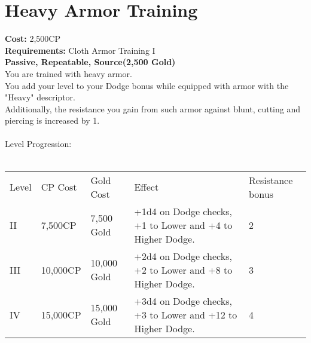 \section{Heavy Armor Training}\label{perk:heavyArmorTraining}
\textbf{Cost:} 2,500CP\\
\textbf{Requirements:} Cloth Armor Training I\\
\textbf{Passive, Repeatable, Source(2,500 Gold)}\\
You are trained with heavy armor.\\
You add your level to your Dodge bonus while equipped with armor with the "Heavy" descriptor.\\
Additionally, the resistance you gain from such armor against blunt, cutting and piercing is increased by 1.\\
\\

Level Progression:\\
\\
\begin{tabular}{l | l | l | l | l}
    Level & CP Cost & Gold Cost & Effect & Resistance bonus \\
    II
    & 7,500CP
    & 7,500 Gold
    & +1d4 on Dodge checks, +1 to Lower and +4 to Higher Dodge.
    & 2
    \\
    III
    & 10,000CP
    & 10,000 Gold
    & +2d4 on Dodge checks, +2 to Lower and +8 to Higher Dodge.
    & 3
    \\
    IV
    & 15,000CP
    & 15,000 Gold
    & +3d4 on Dodge checks, +3 to Lower and +12 to Higher Dodge.
    & 4
    \\
\end{tabular}